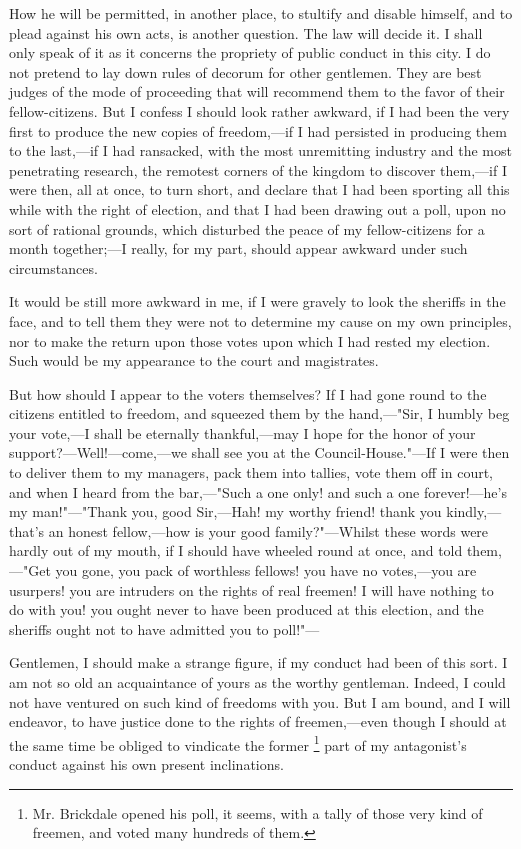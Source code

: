 How he will be permitted, in another place, to stultify and disable himself, and to plead against his own acts, is another question. The law will decide it. I shall only speak of it as it concerns the propriety of public conduct in this city. I do not pretend to lay down rules of decorum for other gentlemen. They are best judges of the mode of proceeding that will recommend them to the favor of their fellow-citizens. But I confess I should look rather awkward, if I had been the very first to produce the new copies of freedom,—if I had persisted in producing them to the last,—if I had ransacked, with the most unremitting industry and the most penetrating research, the remotest corners of the kingdom to discover them,—if I were then, all at once, to turn short, and declare that I had been sporting all this while with the right of election, and that I had been drawing out a poll, upon no sort of rational grounds, which disturbed the peace of my fellow-citizens for a month together;—I really, for my part, should appear awkward under such circumstances.

It would be still more awkward in me, if I were gravely to look the sheriffs in the face, and to tell them they were not to determine my cause on my own principles, nor to make the return upon those votes upon which I had rested my election. Such would be my appearance to the court and magistrates.

But how should I appear to the voters themselves? If I had gone round to the citizens entitled to freedom, and squeezed them by the hand,—"Sir, I humbly beg your vote,—I shall be eternally thankful,—may I hope for the honor of your support?—Well!—come,—we shall see you at the Council-House."—If I were then to deliver them to my managers, pack them into tallies, vote them off in court, and when I heard from the bar,—"Such a one only! and such a one forever!—he's my man!"—"Thank you, good Sir,—Hah! my worthy friend! thank you kindly,—that's an honest fellow,—how is your good family?"—Whilst these words were hardly out of my mouth, if I should have wheeled round at once, and told them,—"Get you gone, you pack of worthless fellows! you have no votes,—you are usurpers! you are intruders on the rights of real freemen! I will have nothing to do with you! you ought never to have been produced at this election, and the sheriffs ought not to have admitted you to poll!"—

Gentlemen, I should make a strange figure, if my conduct had been of this sort. I am not so old an acquaintance of yours as the worthy gentleman. Indeed, I could not have ventured on such kind of freedoms with you. But I am bound, and I will endeavor, to have justice done to the rights of freemen,—even though I should at the same time be obliged to vindicate the former
\footnote{Mr. Brickdale opened his poll, it seems, with a tally of those very kind of freemen, and voted many hundreds of them.}
part of my antagonist's conduct against his own present inclinations.

